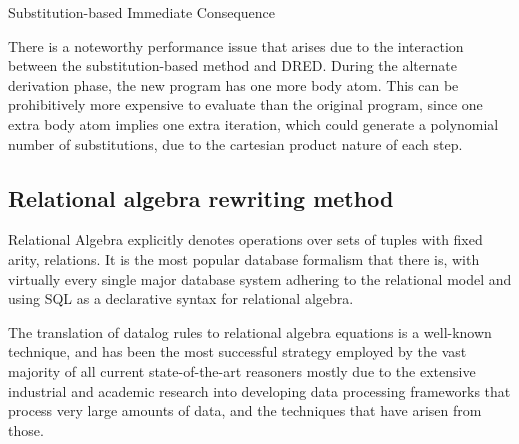 \documentclass[sigconf,screen,review=false,natbib]{acmart}
\theoremstyle{definition}
\begin{document}
\begin{algorithm}
	\SetAlgoLined
	\caption{Substitution-based Immediate Consequence}
\end{algorithm}
There is a noteworthy performance issue that arises due to the interaction between the substitution-based method
and DRED. During the alternate derivation phase, the new program has one more body atom. This can be prohibitively
more expensive to evaluate than the original program, since one extra body atom implies one extra iteration, which
could generate a polynomial number of substitutions, due to the cartesian product nature of each step.

\subsection{Relational algebra rewriting method}
Relational Algebra\cite{codd_1970} explicitly denotes operations over sets of tuples with fixed
arity, relations. It is the most popular database formalism that there is, with virtually every single
major database system adhering to the relational model\cite{pg,mysql,sqlserver} and using SQL as a
declarative syntax for relational algebra.

The translation of datalog rules to relational algebra equations is a well-known technique, and has been
the most successful strategy employed by the vast majority of all current state-of-the-art reasoners\cite{bigdatalog, cog, nexus, recstep, dcdatalog, souffle}
mostly due to the extensive industrial and academic research into developing data processing frameworks
that process very large amounts of data, and the techniques that have arisen from those.
\end{document}
